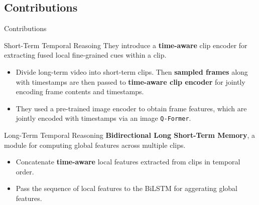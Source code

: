 \subsection{Contributions}
\begin{frame}{Contributions}
    \begin{block}{Short-Term Temporal Reasoing}
        They introduce a \textbf{time-aware} clip encoder for extracting fused local fine-grained cues within a clip. 
        \begin{itemize}
            \item Divide long-term video into short-term clips. Then \textbf{sampled frames} along with timestamps are then passed to \textbf{time-aware clip encoder} for jointly encoding frame contents and timestamps.
            \item They used a pre-trained image encoder to obtain frame features, which are jointly encoded with timestamps via an image \texttt{Q-Former}.
        \end{itemize}
    \end{block}
    \begin{block}{Long-Term Temporal Reasoning}
        \textbf{Bidirectional Long Short-Term Memory}, a module for computing global features across multiple clips. 
        \begin{itemize}
            \item Concatenate \textbf{time-aware} local features extracted from clips in temporal order.
            \item Pass the sequence of local features to the BiLSTM for aggerating global features. 
        \end{itemize}
    \end{block}
\end{frame}